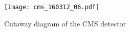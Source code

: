\documentclass[oneside]{memoir}
\begin{document}




\tableofcontents
\thispagestyle{empty}



\begin{figure}
\centerline{
    \texttt{[image: cms\_160312\_06.pdf]}}
    \caption{Cutaway diagram of the CMS detector \cite{Sakuma_2014}}

\end{figure}



\end{document}
